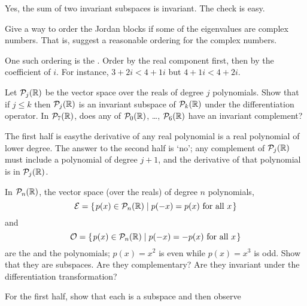 \begin{exercises}
\begin{answer}
      Yes, the sum of two invariant subspaces is invariant.
      The check is easy.  
    \end{answer}
  \item 
     Give a way to order the Jordan blocks if some of the eigenvalues
     are complex numbers.
     That is, suggest a reasonable ordering for the complex numbers.
     \begin{answer}
       One such ordering is the .
       Order by the real component first, then by the coefficient of \( i \).
       For instance, \( 3+2i<4+1i \) but \( 4+1i<4+2i \).  
     \end{answer}
  \item
    Let \( \mathcal{P}_j(\mathbb{R}) \) be the vector space over
    the reals of degree \( j \) polynomials.
    Show that if \( j\le k \) then \( \mathcal{P}_j(\mathbb{R}) \) is an invariant
    subspace of \( \mathcal{P}_k(\mathbb{R}) \) under the differentiation operator.
    In \( \mathcal{P}_7(\mathbb{R}) \), does any of \( \mathcal{P}_0(\mathbb{R}) \),
    \ldots, \( \mathcal{P}_6(\mathbb{R}) \) have an invariant complement?
    \begin{answer}
     The first half is easy\Dash the derivative of any real polynomial is
      a real polynomial of lower degree.
      The answer to the second half is `no'; any complement of
      \( \mathcal{P}_j(\mathbb{R}) \) must include a polynomial of degree \( j+1 \),
      and the derivative of that polynomial is in \( \mathcal{P}_j(\mathbb{R})\).  
     \end{answer}
  \item
    In \( \mathcal{P}_n(\mathbb{R}) \), the vector space (over the
    reals) of degree \( n \) polynomials,
    \begin{equation*}
      \mathcal{E}=
      \set{p(x)\in\polyspace_n(\Re)\suchthat p(-x)=p(x) \text{\ for all\ }x}
    \end{equation*}
    and
    \begin{equation*}
      \mathcal{O}=
      \mbox{$\{\hspace{0.1em}p(x)\in\mathcal{P}_n(\mathbb{R})\mid p(-x)=-p(x) \text{\ for all\ }x\hspace{0.1em}\}$}
    \end{equation*}
    are the  
    and the 
     polynomials; \( p(x)=x^2 \) is
    even while \( p(x)=x^3 \) is odd.
    Show that they are subspaces.
    Are they complementary?
    Are they invariant under the differentiation transformation?
    \begin{answer}
      For the first half, show that each is a subspace and then observe

\end{answer}
\end{exercises}
